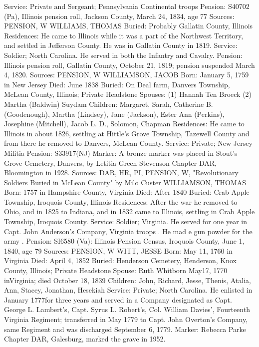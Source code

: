 Service: Private and Sergeant; Pennsylvania Continental troops 
Pension: S40702 (Pa), Illinois pension roll, Jackson County, March 24, 1834, age 77 
Sources: PENSION, W 
WILLIAMS, THOMAS 
Buried: Probably Gallatin County, Illinois 
Residences: He came to Illinois while it was a part of the Northwest Territory, and settled in Jefferson County. He was in Gallatin County in 1819.
Service: Soldier; North Carolina. He served in both the Infantry and Cavalry. 
Pension: Illinois pension roll, Gallatin County, October 21, 1819; pension sus­pended March 4, 1820. 
Sources: PENSION, W 
WILLIAMSON, JACOB 
Born: January 5, 1759 in New Jersey
Died: June 1838 
Buried: On Deal farm, Danvers Township, McLean County, Illinois; Private Headstone 
Spouses:  (1) Hannah Ten Broeck 
	  (2) Martha (Baldwin) Suydam 
Children: Margaret, Sarah, Catherine B. (Goodenough), Martha (Lindsey), Jane (Jackson), Ester Ann (Perkins), Josephine (Mitchell), Jacob L. D., Solomon, Chapman 
Residences: He came to Illinois in about 1826, settling at Hittle's Grove Town­ship, Tazewell County and from there he removed to Danvers, McLean County. 
Service: Private; New Jersey Militia 
Pension: S33917(NJ) 
Marker: A bronze marker was placed in Stout's Grove Cemetery, Danvers, by Letitia Green Stevenson Chapter DAR, Bloomington in 1928. 
Sources: DAR, HR, PI, PENSION, W, "Revolutionary Soldiers Buried in McLean County" by Milo Custer 
WILLIAMSON, THOMAS 
Born: 1757 in Hampshire County, Virginia 
Died: After 1840 
Buried: Crab Apple Township, Iroquois County, Illinois 
Residences: After the war he removed to Ohio, and in 1825 to Indiana, and in 1832 came to Illinois, settling in Crab Apple Township, Iroquois County.  
Service: Soldier; Virginia. He served for one year in Capt. John Anderson's Company, Virginia troops . He mad e gun powder for the army . 
Pension: SI6580 (Va): Illinois Pension Census, Iroquois County, June 1, 1840, age 79 
Sources: PENSION, W 
WITT, JESSE 
Born: May 11, 1760 in Virginia 
Died: April 4, 1852 
Buried: Henderson Cemetery, Henderson, Knox County, Illinois; Private Head­stone 
Spouse: Ruth Whitborn May17, 1770 inVirginia; died October 18, 1839 
Children: John, Richard, Jesse, Thenis, Atalia, Ann, Stacey, Jonathan, Hesekiah 
Service: Private; North Carolina. He enlisted in January 1777for three years and served in a Company designated as Capt. George L. Lambert's, Capt. Syrus L. Robert’s, Col. William Davies', Fourteenth Virginia Regiment; transferred in May 1779 to Capt. John Overton's Company, same Regiment and was discharged September 6, 1779. 
Marker: Rebecca Parke Chapter DAR, Galesburg, marked the grave in 1952. 
